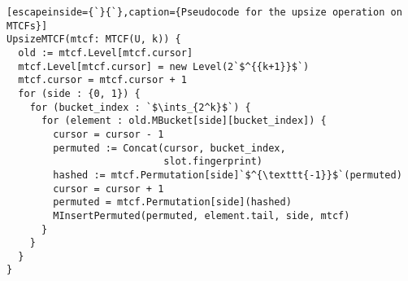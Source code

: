 \documentclass[sigconf, nonacm]{acmart}
\newcommand{\ints}{\mathbb{Z}}
\newcommand{\dotcup}{\ensuremath{\mathaccent\cdot\cup}}
\begin{document}

\begin{lstlisting}[escapeinside={`}{`},caption={Pseudocode for the upsize operation on MTCFs}]
UpsizeMTCF(mtcf: MTCF(U, k)) {
  old := mtcf.Level[mtcf.cursor]
  mtcf.Level[mtcf.cursor] = new Level(2`$^{{k+1}}$`)
  mtcf.cursor = mtcf.cursor + 1
  for (side : {0, 1}) {
    for (bucket_index : `$\ints_{2^k}$`) {
      for (element : old.MBucket[side][bucket_index]) {
        cursor = cursor - 1
        permuted := Concat(cursor, bucket_index,
                           slot.fingerprint)
        hashed := mtcf.Permutation[side]`$^{\texttt{-1}}$`(permuted)
        cursor = cursor + 1
        permuted = mtcf.Permutation[side](hashed)
        MInsertPermuted(permuted, element.tail, side, mtcf)
      }
    }
  }
}
\end{lstlisting}



\end{document}
